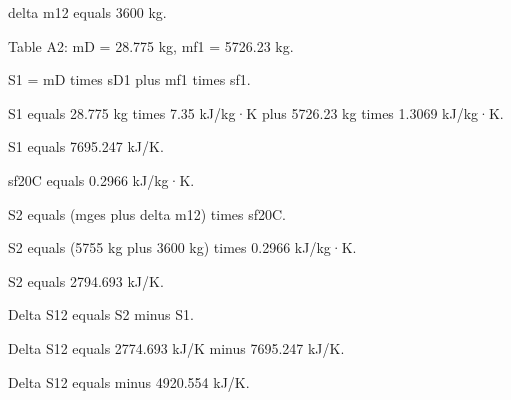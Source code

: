 delta m12 equals 3600 kg.  

Table A2:  
mD = 28.775 kg, mf1 = 5726.23 kg.  

S1 = mD times sD1 plus mf1 times sf1.  

S1 equals 28.775 kg times 7.35 kJ/kg·K plus 5726.23 kg times 1.3069 kJ/kg·K.  

S1 equals 7695.247 kJ/K.  

sf20C equals 0.2966 kJ/kg·K.  

S2 equals (mges plus delta m12) times sf20C.  

S2 equals (5755 kg plus 3600 kg) times 0.2966 kJ/kg·K.  

S2 equals 2794.693 kJ/K.  

Delta S12 equals S2 minus S1.  

Delta S12 equals 2774.693 kJ/K minus 7695.247 kJ/K.  

Delta S12 equals minus 4920.554 kJ/K.